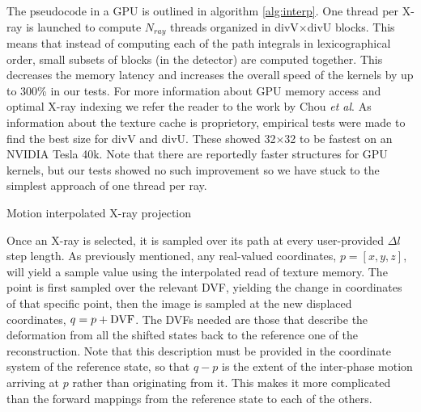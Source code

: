 The pseudocode in a GPU is outlined in algorithm \ref{alg:interp}.  One thread per X-ray is launched to compute $N_{ray}$ threads organized in divV$\times$divU blocks.  This means that instead of computing each of the path integrals in lexicographical order, small subsets of blocks (in the detector) are computed together.  This decreases the memory latency and increases the overall speed of the kernels by up to 300\% in our tests.  For more information about GPU memory access and optimal X-ray indexing we refer the reader to the work by Chou \emph{et al}\cite{Chou2011}.  As information about the texture cache is proprietory, empirical tests were made to find the best size for divV and divU.  These showed 32$\times$32 to be fastest on an NVIDIA Tesla 40k.  Note that there are reportedly faster structures for GPU kernels\cite{forwardproj}, but our tests showed no such improvement so we have stuck to the simplest approach of one thread per ray.

\begin{algorithm}

\caption{Motion interpolated X-ray projection
\label{alg:interp}}
\begin{algorithmic}[1]
    
\EndFor
\EndKernel{} 
\end{algorithmic}

\end{algorithm}

Once an X-ray is selected, it is sampled over its path at every user-provided $\Delta l$ step length.  As previously mentioned, any real-valued coordinates, $p=[x,y,z]$, will yield a sample value using the interpolated read of texture memory.  The point is first sampled over the relevant DVF, yielding the change in coordinates of that specific point, then the image is sampled at the new displaced coordinates, $q=p+\textup{DVF}$.  The DVFs needed are those that describe the deformation from all the shifted states back to the reference one of the reconstruction.   Note that this description must be provided in the coordinate system of the reference state, so that $q-p$ is the extent of the inter-phase motion arriving at $p$ rather than originating from it.  This makes it more complicated than the forward mappings from the reference state to each of the others.



